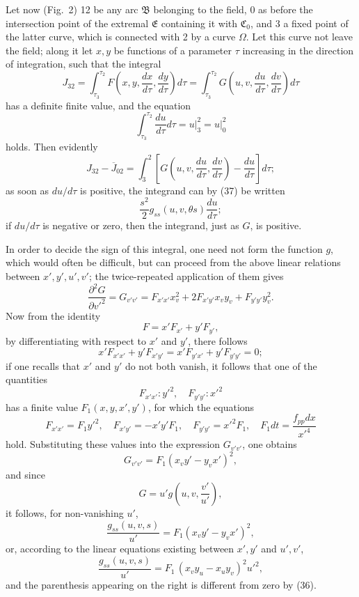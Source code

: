 \documentclass[11pt,a4paper,leqno]{article}
\begin{document}
Let now (Fig.~2) 12 be any arc $\mathfrak{B}$ belonging to the field, 0 as before the intersection point of the extremal $\mathfrak{E}$ containing it with $\mathfrak{C}_0$, and 3 a fixed point of the latter curve, which is connected with 2 by a curve $\Omega$. Let this curve not leave the field; along it let $x,y$ be functions of a parameter $\tau$ increasing in the direction of integration, such that the integral
\[
J_{32}=\int_{\tau_3}^{\tau_2}F\left(x,y,\frac{dx}{d\tau},\frac{dy}{d\tau}\right)d\tau
=\int_{\tau_3}^{\tau_2}G\left(u,v,\frac{du}{d\tau},\frac{dv}{d\tau}\right)d\tau
\]
has a definite finite value, and the equation
\begin{equation}\tag{38}
\int_{\tau_3}^{\tau_2}\frac{du}{d\tau}d\tau
=\left.u\right|_3^2
=\left.u\right|_0^2
\end{equation}
holds. Then evidently
\begin{equation}\tag{39}
J_{32}-\overline{J}_{02}
=\int_3^2\left[G\left(u,v,\frac{du}{d\tau},\frac{dv}{d\tau}\right)-\frac{du}{d\tau}\right]d\tau;
\end{equation}
as soon as $du/d\tau$ is positive, the integrand can by (37) be written
\begin{equation}\tag{40}
\frac{s^2}{2}g_{ss}(u,v,\theta s)\frac{du}{d\tau};
\end{equation}
if $du/d\tau$ is negative or zero, then the integrand, just as $G$, is positive.

In order to decide the sign of this integral, one need not form the function $g$, which would often be difficult, but can proceed from the above linear relations between $x',y',u',v'$; the twice-repeated application of them gives
\[
\frac{\partial^2G}{\partial v'^2}=G_{v'v'}=F_{x'x'}x_v^2+2F_{x'y'}x_vy_v+F_{y'y'}y_v^2.
\]
Now from the identity
\[
F=x'F_{x'}+y'F_{y'},
\]
by differentiating with respect to $x'$ and $y'$, there follows
\[
x'F_{x'x'}+y'F_{x'y'}=x'F_{y'x'}+y'F_{y'y'}=0;
\]
if one recalls that $x'$ and $y'$ do not both vanish, it follows that one of the quantities
\[
F_{x'x'}:y'^2,
\quad F_{y'y'}:x'^2
\]
has a finite value $F_1(x,y,x',y')$, for which the equations
\[
F_{x'x'}=F_1y'^2,
\quad F_{x'y'}=-x'y'F_1,
\quad F_{y'y'}=x'^2F_1,
\quad F_1dt=\frac{f_{pp}dx}{x'^4}
\]
hold. Substituting these values into the expression $G_{v'v'}$, one obtains
\[
G_{v'v'}=F_1(x_vy'-y_vx')^2,
\]
and since
\[
G=u'g\left(u,v,\frac{v'}{u'}\right),
\]
it follows, for non-vanishing $u'$,
\[
\frac{g_{ss}(u,v,s)}{u'}=F_1(x_vy'-y_vx')^2,
\]
or, according to the linear equations existing between $x',y'$ and $u',v'$,
\[
\frac{g_{ss}(u,v,s)}{u'}=F_1\,(x_vy_u-x_uy_v)^2u'^2,
\]
and the parenthesis appearing on the right is different from zero by (36).
\end{document}

